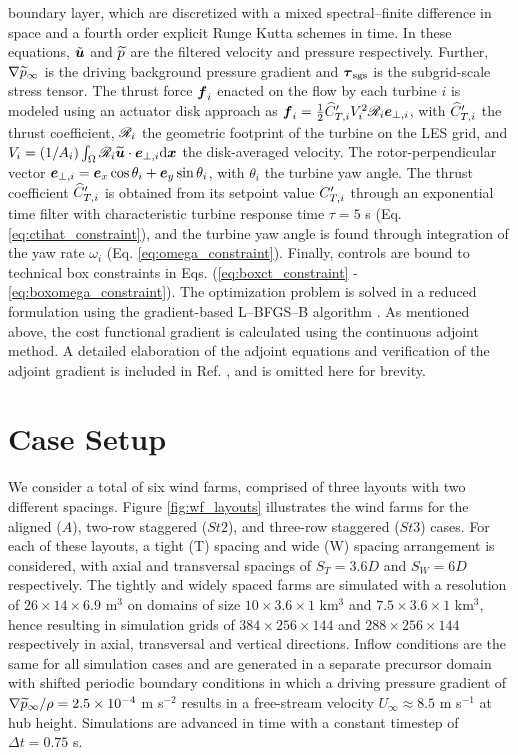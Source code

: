 \documentclass[a4paper]{jpconf}
\begin{document}
boundary layer, which are discretized with a mixed spectral--finite difference in space and a fourth order explicit Runge Kutta schemes in time. 
In these equations, $\tilde{\boldsymbol{u}}$ and $\widetilde{p}$ are the filtered velocity and pressure respectively. Further, $\nabla \widetilde{p}_\infty$ is the driving background pressure gradient and $\boldsymbol{\tau}_{\rm sgs}$ is the subgrid-scale stress tensor. The thrust force $\boldsymbol{f}_i$ enacted on the flow by each turbine $i$ is modeled using an actuator disk approach as 
$\boldsymbol{f}_i = \frac{1}{2} \widehat{C}_{T,i}' V_i^2 \mathscr{R}_i \boldsymbol{e}_{\perp,i}$,
with $\widehat{C}_{T,i}'$ the thrust coefficient, $\mathscr{R}_i$ the geometric footprint of the turbine on the LES grid, and $V_i = (1/A_i) \int_{\Omega} \mathscr{R}_i \widetilde{\boldsymbol{u}} \cdot \boldsymbol{e}_{\perp,i} \text{d}\boldsymbol{x}$ the disk-averaged velocity. The rotor-perpendicular vector $\boldsymbol{e}_{\perp,i} = \boldsymbol{e}_x \cos \theta_i + \boldsymbol{e}_y \sin \theta_i$, with $\theta_i$ the turbine yaw angle. 
The thrust coefficient $\widehat{C}_{T,i}'$ is obtained from its setpoint value $C_{T,i}'$ through an exponential time filter with characteristic turbine response time $\tau = 5$ s (Eq. \ref{eq:ctihat_constraint}), and the turbine yaw angle is found through integration of the yaw rate $\omega_i$ (Eq. \ref{eq:omega_constraint}). Finally, controls are bound to technical box constraints in Eqs. (\ref{eq:boxct_constraint} - \ref{eq:boxomega_constraint}).
The optimization problem is solved in a reduced formulation using the gradient-based {L--BFGS--B} algorithm \cite{byrd}. As mentioned above, the cost functional gradient is calculated using the continuous adjoint method. A detailed elaboration of the adjoint equations and verification of the adjoint gradient is included in Ref. \cite{muntersenergies}, and is omitted here for brevity. 

\section{Case Setup}\label{sec:setup}
We consider a total of six wind farms, comprised of three layouts with two different spacings. Figure \ref{fig:wf_layouts} illustrates the wind farms
for the aligned ($A$), two-row staggered ($St2$), and three-row staggered ($St3$) cases. For each of these layouts, a tight (T) spacing and wide (W)
spacing arrangement is considered, with axial and transversal spacings of $S_T = 3.6D$ and $S_W = 6D$ respectively. The tightly and widely spaced
farms are simulated with a resolution of $26 \times 14 \times 6.9$ m$^3$ on domains of size $10 \times 3.6 \times 1$ km$^3$ and $7.5 \times 3.6 \times 1$ km$^3$,
hence resulting in simulation grids of $384 \times 256 \times 144$ and $288 \times 256 \times 144$ respectively in axial, transversal and vertical
directions. Inflow conditions are the same for all simulation cases and are generated in a separate precursor domain with shifted periodic boundary
conditions \cite{muntersshift} in which a driving pressure gradient of $\nabla \widetilde{p}_\infty / \rho = 2.5 \times 10^{-4}$ m s$^{-2}$ results in a
free-stream velocity $U_\infty \approx 8.5 $ m s$^{-1}$ at hub height. Simulations are advanced in time with a constant timestep of $\Delta t = 0.75$ s. 
\end{document}
